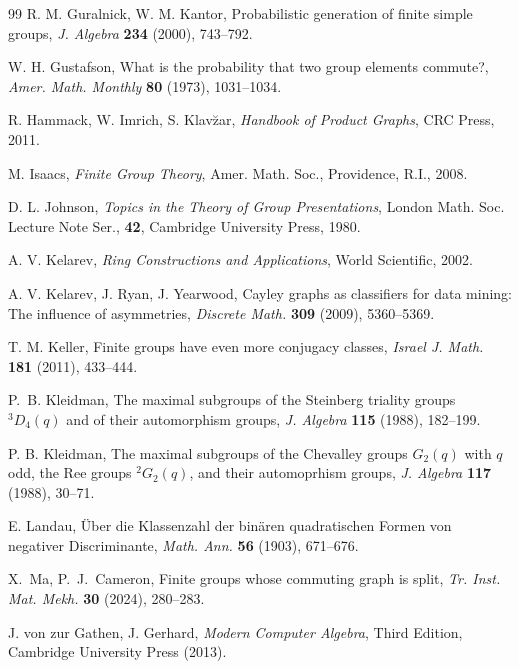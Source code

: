 \documentclass{elsarticle}
\begin{document}
\begin{thebibliography}{99}
R. M. Guralnick, W. M. Kantor,
Probabilistic generation of finite simple groups,
\textit{J. Algebra} \textbf{234} (2000), 743--792.

W. H. Gustafson,
What is the probability that two group elements commute?,
\textit{Amer. Math. Monthly} \textbf{80} (1973), 1031--1034.

R. Hammack, W. Imrich, S. Klav\u{z}ar,
\textit{Handbook of Product Graphs},
CRC Press, 2011.

M. Isaacs,
\textit{Finite Group Theory},
Amer. Math. Soc., Providence, R.I., 2008.

D. L. Johnson,
\textit{Topics in the Theory of Group Presentations},
London Math. Soc. Lecture Note Ser., \textbf{42},
Cambridge University Press, 1980.

A. V. Kelarev,
\textit{Ring Constructions and Applications},
World Scientific, 2002.

A. V. Kelarev, J. Ryan, J. Yearwood,
Cayley graphs as classifiers for data mining: The influence of asymmetries,
\textit{Discrete  Math.} \textbf{309} (2009), 5360--5369.

T. M. Keller,
Finite groups have even more conjugacy classes,
\textit{Israel J. Math.} \textbf{181} (2011), 433--444.

P.~B. Kleidman,
The maximal subgroups of the Steinberg triality groups ${}^3D_4(q)$ and
of their automorphism groups,
\textit{J. Algebra} \textbf{115} (1988), 182--199.

P. B. Kleidman,
The maximal subgroups of the Chevalley groups $G_2(q)$ with $q$ odd,
the Ree groups ${}^2G_2(q)$, and their automoprhism groups,
\textit{J. Algebra} \textbf{117} (1988), 30--71.

E. Landau,
\"Uber die Klassenzahl der bin\"aren quadratischen Formen von negativer
Discriminante,
\textit{Math. Ann.} \textbf{56} (1903), 671--676.

X.~Ma, P.~J.~Cameron,
Finite groups whose commuting graph is split,
\textit{Tr. Inst. Mat. Mekh.} \textbf{30} (2024),
280--283.

  J. von zur Gathen, J. Gerhard,
  \textit{Modern Computer Algebra},
  Third Edition, Cambridge University Press (2013).



\end{thebibliography}
\end{document}
